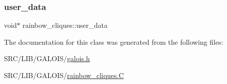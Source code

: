 \subsubsection{\texorpdfstring{user\+\_\+data}{user\_data}}
{\footnotesize\ttfamily void$\ast$ rainbow\+\_\+cliques\+::user\+\_\+data}



The documentation for this class was generated from the following files\+:\begin{DoxyCompactItemize}
\item 
S\+R\+C/\+L\+I\+B/\+G\+A\+L\+O\+I\+S/\mbox{\hyperlink{galois_8h}{galois.\+h}}\item 
S\+R\+C/\+L\+I\+B/\+G\+A\+L\+O\+I\+S/\mbox{\hyperlink{rainbow__cliques_8_c}{rainbow\+\_\+cliques.\+C}}\end{DoxyCompactItemize}
